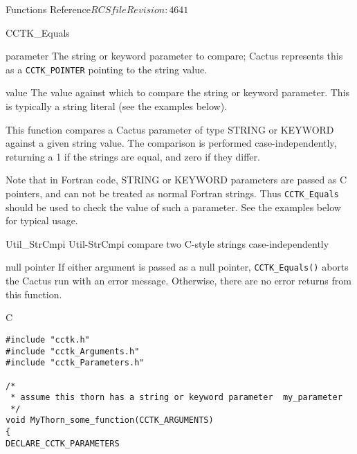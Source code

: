 \begin{cactuspart}{ Functions Reference}{$RCSfile$}{$Revision: 4641 $}
\begin{FunctionDescription}{CCTK\_Equals}
\begin{ParameterSection}
\begin{Parameter}{parameter}
The string or keyword parameter to compare; Cactus represents this
as a \verb|CCTK_POINTER| pointing to the string value.
\end{Parameter}
\begin{Parameter}{value}
The value against which to compare the string or keyword parameter.
This is typically a string literal (see the examples below).
\end{Parameter}
\end{ParameterSection}

\begin{Discussion}
This function compares a Cactus parameter of type STRING or KEYWORD against a
given string value. The comparison is performed case-independently,
returning a 1 if the strings are equal, and zero if they differ.

Note that in Fortran code, STRING or KEYWORD parameters are passed as C
pointers, and can not be treated as normal Fortran strings. Thus
\verb|CCTK_Equals| should be used to check the value of such a parameter.
See the examples below for typical usage.
\end{Discussion}

\begin{SeeAlsoSection}
\begin{SeeAlso2} {Util\_StrCmpi} {Util-StrCmpi}
compare two C-style strings case-independently
\end{SeeAlso2}
\end{SeeAlsoSection}

\begin{ErrorSection}
\begin{Error}{null pointer}
If either argument is passed as a null pointer, \verb|CCTK_Equals()|
aborts the Cactus run with an error message.  Otherwise, there are no
error returns from this function.
\end{Error}
\end{ErrorSection}

\begin{ExampleSection}
\begin{Example}{C}
\begin{verbatim}
#include "cctk.h"
#include "cctk_Arguments.h"
#include "cctk_Parameters.h"

/*
 * assume this thorn has a string or keyword parameter  my_parameter
 */
void MyThorn_some_function(CCTK_ARGUMENTS)
{
DECLARE_CCTK_PARAMETERS


\end{verbatim}
\end{Example}
\end{ExampleSection}
\end{FunctionDescription}
\end{cactuspart}
